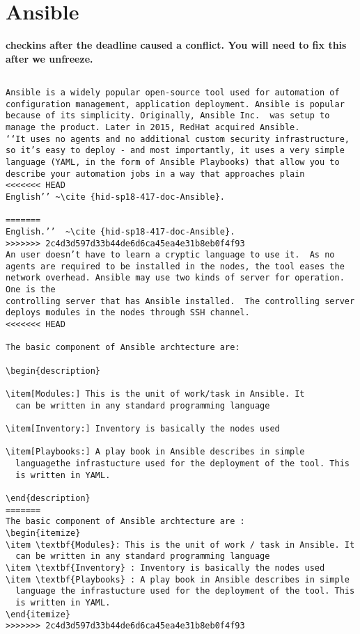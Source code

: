 \section{Ansible}

{\bf checkins after the deadline caused a conflict. You will need to
  fix this after we unfreeze.}

\begin{verbatim}

Ansible is a widely popular open-source tool used for automation of
configuration management, application deployment. Ansible is popular
because of its simplicity. Originally, Ansible Inc.  was setup to
manage the product. Later in 2015, RedHat acquired Ansible.
‘‘It uses no agents and no additional custom security infrastructure,
so it’s easy to deploy - and most importantly, it uses a very simple
language (YAML, in the form of Ansible Playbooks) that allow you to
describe your automation jobs in a way that approaches plain
<<<<<<< HEAD
English’’ ~\cite {hid-sp18-417-doc-Ansible}.

=======
English.’’  ~\cite {hid-sp18-417-doc-Ansible}.
>>>>>>> 2c4d3d597d33b44de6d6ca45ea4e31b8eb0f4f93
An user doesn’t have to learn a cryptic language to use it.  As no
agents are required to be installed in the nodes, the tool eases the
network overhead. Ansible may use two kinds of server for operation. One is the
controlling server that has Ansible installed.  The controlling server
deploys modules in the nodes through SSH channel.
<<<<<<< HEAD

The basic component of Ansible archtecture are: 

\begin{description}

\item[Modules:] This is the unit of work/task in Ansible. It
  can be written in any standard programming language

\item[Inventory:] Inventory is basically the nodes used

\item[Playbooks:] A play book in Ansible describes in simple
  languagethe infrastucture used for the deployment of the tool. This
  is written in YAML.

\end{description}
=======
The basic component of Ansible archtecture are : 
\begin{itemize}
\item \textbf{Modules}: This is the unit of work / task in Ansible. It
  can be written in any standard programming language
\item \textbf{Inventory} : Inventory is basically the nodes used
\item \textbf{Playbooks} : A play book in Ansible describes in simple
  language the infrastucture used for the deployment of the tool. This
  is written in YAML.
\end{itemize}
>>>>>>> 2c4d3d597d33b44de6d6ca45ea4e31b8eb0f4f93


\end{verbatim}